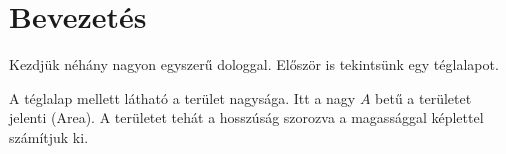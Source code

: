 \documentclass{article}
\begin{document}
\section*{Bevezetés}
Kezdjük néhány nagyon egyszerű dologgal. Először is tekintsünk egy téglalapot.
\begin{center}
\centering
{}
\end{center}
A téglalap mellett látható a terület nagysága. Itt a nagy $A$ betű a területet jelenti (Area). A területet tehát a hosszúság szorozva a magassággal képlettel számítjuk ki.
\end{document}
